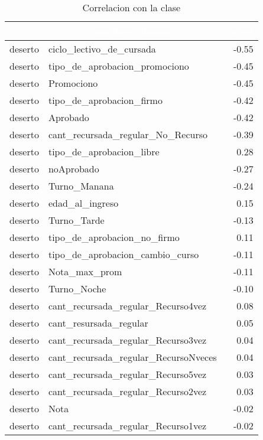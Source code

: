\begin{table}[!h]
	
	\caption{\label{tab:tablon_correl_clase}Correlacion con la clase}
	\centering
	\begin{tabular}[t]{llr}
		\toprule
		\rowcolor{black}  \multicolumn{1}{c}{\textcolor{white}{\textbf{nombrefila}}} & \multicolumn{1}{c}{\textcolor{white}{\textbf{nombrecolumna}}} & \multicolumn{1}{c}{\textcolor{white}{\textbf{correl}}}\\
		\midrule
		\rowcolor{gray!6}  deserto & ciclo\_lectivo\_de\_cursada & -0.55\\
		deserto & tipo\_de\_aprobacion\_promociono & -0.45\\
		\rowcolor{gray!6}  deserto & Promociono & -0.45\\
		deserto & tipo\_de\_aprobacion\_firmo & -0.42\\
		\rowcolor{gray!6}  deserto & Aprobado & -0.42\\
		\addlinespace
		deserto & cant\_recursada\_regular\_No\_Recurso & -0.39\\
		\rowcolor{gray!6}  deserto & tipo\_de\_aprobacion\_libre & 0.28\\
		deserto & noAprobado & -0.27\\
		\rowcolor{gray!6}  deserto & Turno\_Manana & -0.24\\
		deserto & edad\_al\_ingreso & 0.15\\
		\addlinespace
		\rowcolor{gray!6}  deserto & Turno\_Tarde & -0.13\\
		deserto & tipo\_de\_aprobacion\_no\_firmo & 0.11\\
		\rowcolor{gray!6}  deserto & tipo\_de\_aprobacion\_cambio\_curso & -0.11\\
		deserto & Nota\_max\_prom & -0.11\\
		\rowcolor{gray!6}  deserto & Turno\_Noche & -0.10\\
		\addlinespace
		deserto & cant\_recursada\_regular\_Recurso4vez & 0.08\\
		\rowcolor{gray!6}  deserto & cant\_resursada\_regular & 0.05\\
		deserto & cant\_recursada\_regular\_Recurso3vez & 0.04\\
		\rowcolor{gray!6}  deserto & cant\_recursada\_regular\_RecursoNveces & 0.04\\
		deserto & cant\_recursada\_regular\_Recurso5vez & 0.03\\
		\addlinespace
		\rowcolor{gray!6}  deserto & cant\_recursada\_regular\_Recurso2vez & 0.03\\
		deserto & Nota & -0.02\\
		\rowcolor{gray!6}  deserto & cant\_recursada\_regular\_Recurso1vez & -0.02\\
		\bottomrule
	\end{tabular}
\end{table}
